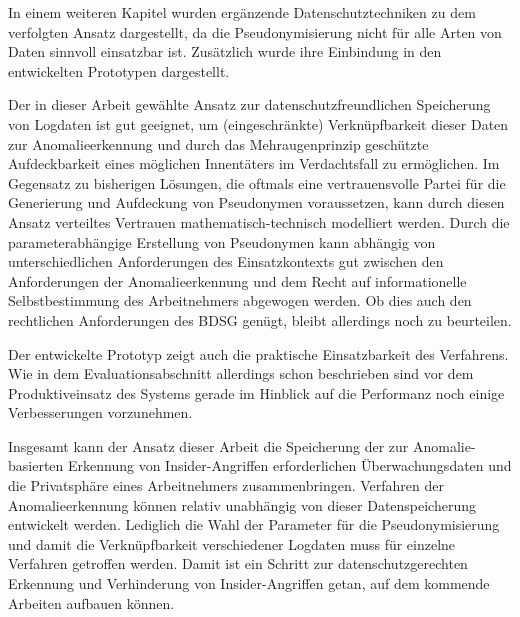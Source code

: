 In einem weiteren Kapitel wurden ergänzende Datenschutztechniken zu dem verfolgten Ansatz dargestellt, da die Pseudonymisierung nicht für alle Arten von Daten sinnvoll einsatzbar ist. Zusätzlich wurde ihre Einbindung in den entwickelten Prototypen dargestellt.

Der in dieser Arbeit gewählte Ansatz zur datenschutzfreundlichen Speicherung von Logdaten ist gut geeignet, um (eingeschränkte) Verknüpfbarkeit dieser Daten zur Anomalieerkennung und durch das Mehraugenprinzip geschützte Aufdeckbarkeit eines möglichen Innentäters im Verdachtsfall zu ermöglichen. Im Gegensatz zu bisherigen Lösungen, die oftmals eine vertrauensvolle Partei für die Generierung und Aufdeckung von Pseudonymen voraussetzen, kann durch diesen Ansatz verteiltes Vertrauen mathematisch-technisch modelliert werden. Durch die parameterabhängige Erstellung von Pseudonymen kann 
abhängig von unterschiedlichen Anforderungen des Einsatzkontexts gut zwischen den Anforderungen der Anomalieerkennung und dem Recht auf informationelle Selbstbestimmung des Arbeitnehmers abgewogen werden. Ob dies auch den rechtlichen Anforderungen des BDSG genügt, bleibt allerdings noch zu beurteilen.

Der entwickelte Prototyp zeigt auch die praktische Einsatzbarkeit des Verfahrens. Wie in dem Evaluationsabschnitt allerdings schon beschrieben sind vor dem Produktiveinsatz des Systems gerade im Hinblick auf die Performanz noch einige Verbesserungen vorzunehmen.

Insgesamt kann der Ansatz dieser Arbeit die Speicherung der zur Anomalie-basierten Erkennung von Insider-Angriffen erforderlichen Überwachungsdaten und die Privatsphäre eines Arbeitnehmers zusammenbringen. Verfahren der Anomalieerkennung können relativ unabhängig von dieser Datenspeicherung entwickelt werden. Lediglich die Wahl der Parameter für die Pseudonymisierung und damit die Verknüpfbarkeit verschiedener Logdaten muss für einzelne Verfahren getroffen werden. Damit ist ein Schritt zur datenschutzgerechten Erkennung und Verhinderung von Insider-Angriffen getan, auf dem kommende Arbeiten aufbauen können.

%

